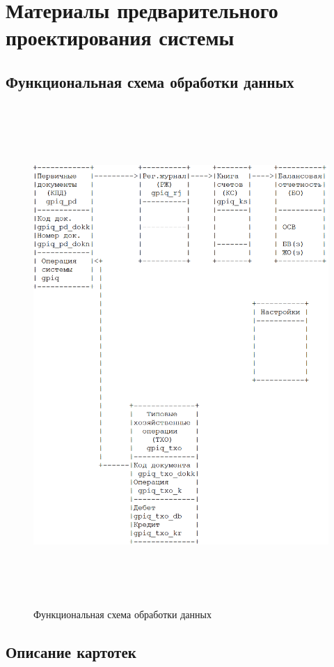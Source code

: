 \section{Материалы предварительного проектирования системы}
\subsection{Функциональная схема обработки данных}

\begin{figure}[!htb]
    \centering
    \includegraphics[height=19cm, width=18cm]
        {_assets/gpiq_part2.png}
    \caption{Функциональная схема обработки данных}
\end{figure}

\subsection{Описание картотек}


